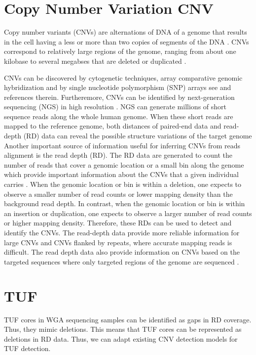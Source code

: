 \section{Copy Number Variation CNV}

Copy number variants (CNVs) are alternations of DNA of a genome that results
in the cell having a less or more than two copies of segments of the DNA \citep{cai2012}.
CNVs correspond to relatively large regions of the genome, ranging from about one kilobase
to several megabses that are deleted or duplicated \cite{cai2012}.

CNVs can be discovered by cytogenetic techniques, array comparative genomic
hybridization and by single nucleotide polymorphism (SNP) arrays see \citep{cai2012} and
references therein. Furtheremore, CNVs can be identified by next-generation sequencing (NGS) 
in high resolution \cite{cai2012}. NGS
can generate millions of short sequence reads along the whole human genome. When these
short reads are mapped to the reference genome, both distances of paired-end data 
and read-depth (RD) data can reveal the possible structure variations of the target genome \cite{cai2012}
Another important source of information useful for inferring CNVs from reads alignment is
the read depth (RD). The RD data are generated to count the number of reads that cover a
genomic location or a small bin along the genome which provide important information
about the CNVs that a given individual carries \cite{cai2012}. 
When the genomic location or bin is within a deletion, one expects to observe a
smaller number of read counts or lower mapping density than the background read depth. In
contrast, when the genomic location or bin is within an insertion or duplication, one expects
to observe a larger number of read counts or higher mapping density. Therefore, these RDs
can be used to detect and identify the CNVs. The read-depth data provide more reliable
information for large CNVs and CNVs flanked by repeats, where accurate mapping reads is
difficult. The read depth data also provide information on CNVs based on the targeted
sequences where only targeted regions of the genome are sequenced \cite{cai2012}.


\section{TUF}
\label{tuf}

TUF cores in WGA sequencing samples can be identified as gaps in RD coverage. Thus, they
mimic deletions. This means that TUF cores can be represented as deletions in RD data. Thus, we can adapt
existing CNV detection models for TUF detection.


























